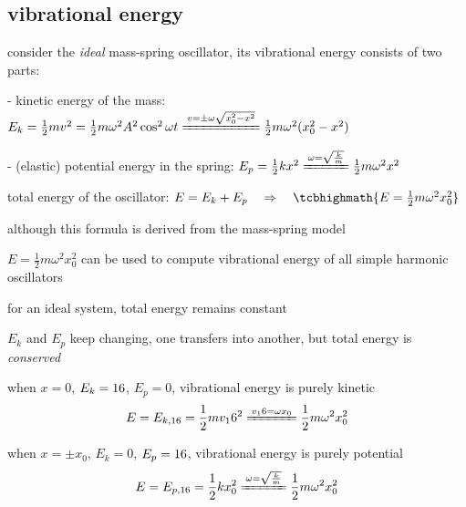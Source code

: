 

\subsection{vibrational energy}

consider the \emph{ideal} mass-spring oscillator, its vibrational energy consists of two parts:

\begin{compactitem}
	\item[-] kinetic energy of the mass: $E_k = \frac{1}{2} mv^2 = \frac{1}{2} m \omega^2 A^2 \cos^2\omega t \xlongequal{v=\pm\omega\sqrt{x_0^2-x^2}} \frac{1}{2}m\omega^2 (x_0^2-x^2)$
	
	\item[-] (elastic) potential energy in the spring: $E_p = \frac{1}{2} kx^2  \xlongequal{\omega = \sqrt{\frac{k}{m}}} \frac{1}{2}m\omega^2 x^2$
\end{compactitem}

total energy of the oscillator: $E = E_k + E_p \RA \tcbhighmath{E = \frac{1}{2}m\omega^2x_0^2}$

\cmt although this formula is derived from the mass-spring model

$E = \frac{1}{2}m\omega^2x_0^2$ can be used to compute vibrational energy of all simple harmonic oscillators

\cmt for an ideal system, total energy remains constant

$E_k$ and $E_p$ keep changing, one transfers into another, but total energy is \emph{conserved}

\cmt when $x=0$, $E_k = 16$, $E_p=0$, vibrational energy is purely kinetic
\begin{equation*}
	E=E_{k,\tmax}=\frac{1}{2}mv_\tmax^2 \xlongequal{v_\tmax = \omega x_0} \frac{1}{2}m\omega^2x_0^2
\end{equation*}

\cmt when $x=\pm x_0$, $E_k = 0$, $E_p=16$, vibrational energy is purely potential
\begin{equation*}
	E=E_{p,\tmax}=\frac{1}{2}kx_0^2 \xlongequal{\omega=\sqrt{\frac{k}{m}}} \frac{1}{2}m\omega^2x_0^2
\end{equation*}

